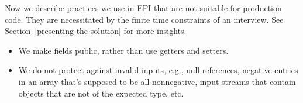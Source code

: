 \documentclass[10pt,openany,twoside,letterpaper,extrafontsizes]{memoir}
\newif\ifCpp
\newif\ifJava
\begin{document}
\begin{Spacing}{\gettingReadySpacing}

Now we describe practices we use in EPI that
are not suitable for production code.
They are necessitated by the finite time constraints of an interview.
See Section~\vref{presenting-the-solution} for more insights.
\begin{itemize}
\item We make fields public, rather than use getters and setters.
\item We do not protect against invalid inputs, e.g., null references, negative
entries in an array that's supposed to be all nonnegative,
input streams that contain objects that are not of the expected type, etc.
\ifJava
\item We occasionally use static fields to pass values---this reduces the number
of classes we need to write, at the cost of losing thread safety.
\item When asked to implement a container class, we do not provide
generic solutions, e.g., we specialize the container to \texttt{Integer},
even when a type like \texttt{? extends Number} will work.
\fi
\ifCpp
\item When asked to implement a container class, we do not provide
generic solutions, e.g., we specialize the container to \texttt{int},
even when a template type like \texttt{<typename T>} will work.
\fi
\end{itemize}


\end{Spacing}
\end{document}
